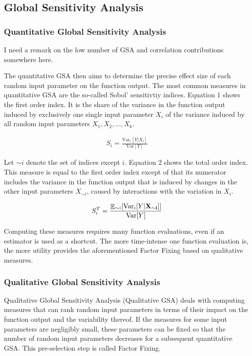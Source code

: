 \documentclass[a4paper,12pt]{article}
\DeclareMathOperator*{\E}{\mathbb{E}}
\begin{document}
\subsection{Global Sensitivity Analysis}
\subsubsection{Quantitative Global Sensitivity Analysis}

I need a remark on the low number of GSA and correlation contributions somewhere here.



The quantitative GSA then aims to determine the precise effect size of each random input parameter on the function output. The most common measures in quantitative GSA are the so-called Sobol' sensitivtiy indices. Equation 1 shows the first order index. It is the share of the variance in the function output induced by exclusively one single input parameter $X_i$ of the variance induced by all random input parameters $X_1, X_2, ..., X_k$.


\begin{align}
S_i = \frac{\text{Var}_i[Y|X_i ]}{\text{Var}[Y]}
\end{align}

\noindent
Let $\sim i$ denote the set of indices except $i$. Equation 2 shows the total order index. This measure is equal to the first order index except of that its numerator includes the variance in the function output that is induced by changes in the other input parameters $X_{\sim i}$, caused by interactions with the variation in $X_i$.

\begin{align}
S_{i}^T = \frac{\E_{\sim i}[\text{Var}_{i}[Y|\bold{X_{\sim i}]]}}{\text{Var}[Y]}
\end{align}

\noindent
Computing these measures requires many function evaluations, even if an estimator is used as a shortcut. The more time-intense one function evaluation is, the more utility provides the aforementioned Factor Fixing based on qualitative measures. 


\subsubsection{Qualitative Global Sensitivity Analysis}

Qualitative Global Sensitivity Analysis (Qualitative GSA) deals with computing measures that can rank random input parameters in terms of their impact on the function output and the variability thereof. If the measures for some input parameters are negligibly small, these parameters can be fixed so that the number of random input parameters decreases for a subsequent quantitative GSA. This pre-selection step is called Factor Fixing.  \\
\end{document}

